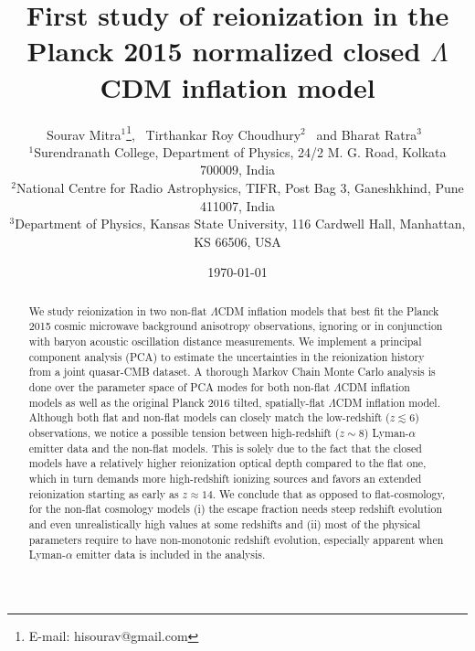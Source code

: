 \documentclass[useAMS,usenatbib]{mnras}
\begin{document}
\title[Reionization in closed $\Lambda$CDM inflation]
{First study of reionization in the Planck 2015 normalized closed $\Lambda$CDM inflation model}
\author[Mitra, Choudhury \& Ratra]
{Sourav Mitra$^1$\thanks{E-mail: hisourav@gmail.com},~
Tirthankar Roy Choudhury$^2$~
and
Bharat Ratra$^3$~\\
$^1$Surendranath College, Department of Physics, 24/2 M. G. Road, Kolkata 700009, India\\
$^2$National Centre for Radio Astrophysics, TIFR, Post Bag 3, Ganeshkhind, Pune 411007, India\\
$^3$Department of Physics, Kansas State University, 116 Cardwell Hall, Manhattan, KS 66506, USA
} 

\maketitle

\date{\today}

\begin{abstract}
We study reionization in two non-flat $\Lambda$CDM inflation 
models that best fit the Planck 2015 cosmic microwave background anisotropy
observations, ignoring or in conjunction with baryon acoustic oscillation 
distance measurements. We implement a principal component analysis (PCA) to 
estimate the uncertainties in the reionization history from a joint 
quasar-CMB dataset. A thorough Markov Chain Monte Carlo analysis is done
over the parameter space of PCA modes for both non-flat $\Lambda$CDM inflation 
models as well as the original Planck 2016 tilted, spatially-flat 
$\Lambda$CDM inflation model. Although both flat and non-flat models can 
closely match the low-redshift ($z\lesssim6$) observations, we notice a 
possible tension between high-redshift ($z\sim8$) Lyman-$\alpha$ emitter 
data and the non-flat models. This is solely due to the fact that the 
closed models have a relatively higher reionization optical depth 
compared to the flat one, which in turn demands more high-redshift ionizing 
sources and favors an extended reionization starting as early as $z\approx14$.
We conclude that as opposed to flat-cosmology, for the non-flat cosmology models
(i) the escape fraction needs steep redshift evolution and even unrealistically
high values at some redshifts and (ii) most of the physical parameters require
to have non-monotonic redshift evolution, especially apparent when Lyman-$\alpha$
emitter data is included in the analysis.
\end{abstract}
\end{document}
